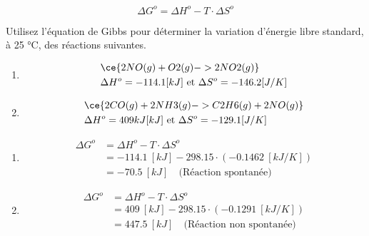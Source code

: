 \documentclass[
  11pt,
  french,
  a4paper,
  openany]{book}
\providecommand{\tightlist}{%
  \setlength{\itemsep}{0pt}\setlength{\parskip}{0pt}}
\begin{document}
\[
\Delta G^o = \Delta H^o - T \cdot \Delta S^o
\]

\begin{Exercise}

Utilisez l'équation de Gibbs pour déterminer la variation d'énergie libre standard, à 25 °C, des réactions suivantes.

\begin{enumerate}
\def\labelenumi{\alph{enumi}.}
\tightlist
\item
  \[
  \begin{split}
  & \ce{2 NO(g) + O2(g) -> 2 NO2(g)} \\
  & \Delta H^o = -114.1 [kJ] \text{ et } \Delta S^o = -146.2 [J/K]
  \end{split}
  \]
\item
  \[
  \begin{split}
  & \ce{2 CO(g) + 2 NH3(g) -> C2H6(g) + 2 NO(g)} \\
  & \Delta H^o = 409 kJ [kJ] \text{ et } \Delta S^o = -129.1 [J/K]
  \end{split}
  \]
\end{enumerate}


\end{Exercise}

\begin{Answer}

\begin{enumerate}
\def\labelenumi{\alph{enumi}.}
\tightlist
\item
  \[
  \begin{split}
  \Delta G^o &= \Delta H^o - T \cdot \Delta S^o \\
  &= -114.1\ [kJ] - 298.15 \cdot (-0.1462\ [kJ/K]) \\
  &= -70.5\ [kJ] \quad \text{(Réaction spontanée)}
  \end{split}
  \]
\item
  \[
  \begin{split}
  \Delta G^o &= \Delta H^o - T \cdot \Delta S^o \\
  &= 409\ [kJ] - 298.15 \cdot (-0.1291\ [kJ/K]) \\
  &= 447.5\ [kJ] \quad \text{(Réaction non spontanée)}
  \end{split}
  \]
\end{enumerate}


\end{Answer}
\end{document}
